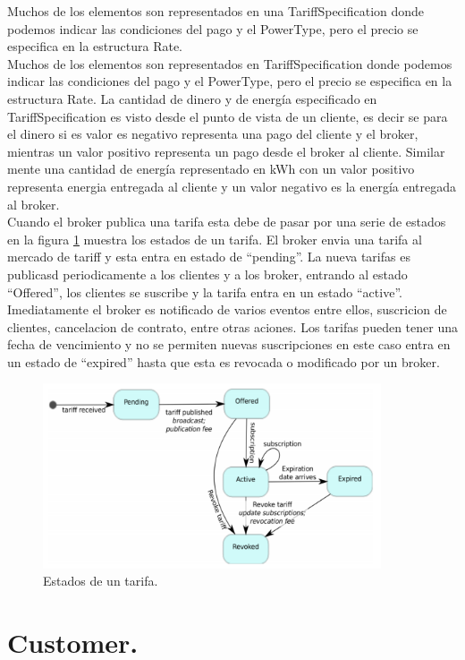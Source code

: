 Muchos de los elementos son representados en una  TariffSpecification donde podemos indicar las condiciones del pago y el PowerType, pero el precio se especifica en la estructura Rate.\\

Muchos de los elementos son representados en TariffSpecification donde podemos indicar las condiciones del pago y el PowerType, pero el precio se especifica en la estructura Rate. La cantidad de dinero y de energía especificado en  TariffSpecification es visto desde el punto de vista de un cliente, es decir se para el dinero si es valor es negativo representa una pago del cliente y el broker, mientras un valor positivo representa un pago desde el broker al cliente. Similar mente una cantidad de energía representado en kWh con un valor positivo representa energia entregada al cliente y un valor negativo es la energía entregada al broker.\\

Cuando el broker publica una tarifa esta debe de pasar por una serie de estados en la figura \ref{state} muestra los estados de un tarifa.  El broker envia una tarifa al mercado de tariff y esta entra en estado de “pending”. La nueva tarifas es publicasd periodicamente a los clientes y a los broker, entrando al estado “Offered”, los clientes se suscribe y la tarifa entra en un estado “active”. Imediatamente el broker es notificado de varios eventos entre ellos, suscricion de clientes,  cancelacion de contrato, entre otras aciones. Los tarifas pueden tener una fecha de vencimiento y no se permiten nuevas suscripciones en este caso entra en un estado de “expired” hasta que esta es revocada o modificado por un broker.

\begin{figure}[h!]
    \centering
    \includegraphics[width=10cm]{img/state.png}
    \caption{Estados de un tarifa.}
    \label{state}
\end{figure}

\section{Customer.}

